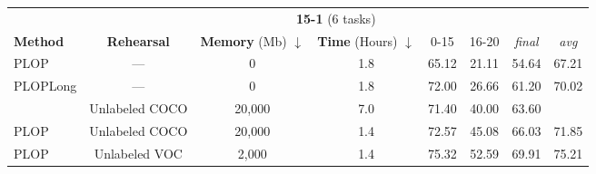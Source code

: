 \begin{table*}[t]
    \centering
    \begin{adjustbox}{max width=\textwidth}
        \begin{tabular}{@{}l|ccc|cccc@{}}
            \toprule
                                                            & \multicolumn{7}{c}{\textbf{15-1} (6 tasks)}                                                                                                                                              \\
            \textbf{Method}                                 & \textbf{Rehearsal}                          & \textbf{Memory} (Mb) $\downarrow$ & \textbf{Time} (Hours) $\downarrow$ & 0-15           & 16-20          & \textit{final} & \textit{avg}   \\
            \midrule
            PLOP                                            & ---                                         & 0                                 & 1.8                                & 65.12          & 21.11          & 54.64          & 67.21          \\
            PLOPLong                                        & ---                                         & 0                                 & 1.8                                & 72.00          & 26.66          & 61.20          & 70.02          \\
            \hdashline
            \citet{yu2020continualsegmentationselftraining} & Unlabeled COCO                              & 20,000                            & 7.0                                & 71.40          & 40.00          & 63.60          &                \\
            PLOP                                            & Unlabeled COCO                              & 20,000                            & 1.4                                & 72.57          & 45.08          & 66.03          & 71.85          \\
            PLOP                                            & Unlabeled VOC                               & 2,000                             & 1.4                                & 75.32          & 52.59          & 69.91          & 75.21          \\

\end{tabular}
\end{adjustbox}
\end{table*}
